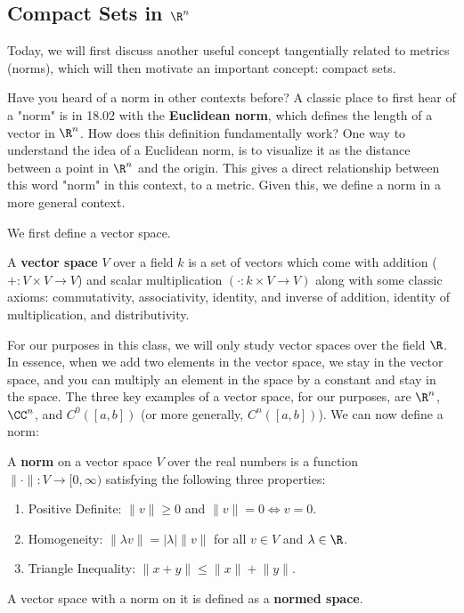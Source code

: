 
\subsection*{Compact Sets in $\R^n$}
Today, we will first discuss another useful concept tangentially related to metrics (norms), which will then motivate an important concept: compact sets.

Have you heard of a norm in other contexts before? A classic place to first hear of a "norm" is in 18.02 with the \textbf{Euclidean norm}, which defines the length of a vector in $\R^n$. How does this definition fundamentally work? One way to understand the idea of a Euclidean norm, is to visualize it as the distance between a point in $\R^n$ and the origin. This gives a direct relationship between this word "norm" in this context, to a metric. Given this, we define a norm in a more general context.

We first define a vector space.
\begin{definition}
A \textbf{vector space} $V$ over a field $k$ is a set of vectors which come with addition ($+: V\times V \to V$) and scalar multiplication $(\cdot: k\times V\to V)$ along with some classic axioms: commutativity, associativity, identity, and inverse of addition, identity of multiplication, and distributivity.
\end{definition}

For our purposes in this class, we will only study vector spaces over the field $\R$. In essence, when we add two elements in the vector space, we stay in the vector space, and you can multiply an element in the space by a constant and stay in the space. The three key examples of a vector space, for our purposes, are $\R^n$, $\CC^n$, and $C^0([a,b])$ (or more generally, $C^n([a,b])$). We can now define a norm:
\begin{definition}[Norm]
A \textbf{norm} on a vector space $V$ over the real numbers is a function $\lVert \cdot\rVert:V\to [0,\infty)$ satisfying the following three properties:
\begin{enumerate}
    \item Positive Definite: $\lVert v\rVert \geq 0$ and $\lVert v\rVert = 0 \iff v = 0$.
    \item Homogeneity: $\lVert \lambda v\rVert = |\lambda| \lVert v\rVert$ for all $v\in V$ and $\lambda \in \R$.
    \item Triangle Inequality: $\lVert x+y\rVert \leq \lVert x\rVert + \lVert y\rVert$.
\end{enumerate}
A vector space with a norm on it is defined as a \textbf{normed space}.
\end{definition}

